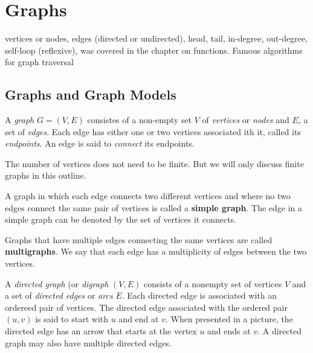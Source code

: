 



\chapter {Graphs}
vertices or nodes, edges (directed or undirected), head, tail, in-degree, out-degree, self-loop (reflexive), was covered in the chapter on functions.
Famous algorithms for graph traversal


\section {Graphs and Graph Models}
\begin{definition}[Graph]
A \textit{graph} $G =(V,E)$ consistes of a non-empty set $V$ of \textit{vertices} or \textit{nodes} and $E$, a set of \textit{edges}. Each edge has either one or two vertices associated ith it, called its \textit{endpoints}. An edge is said to \textit{connect} its endpoints.
\end{definition}
\begin{notes}
The number of vertices does not need to be finite. But we will only discuss finite graphs in this outline.
\end{notes}

\begin {definition} 
A graph in which each edge connects two different vertices and where no two edges connect the same pair of vertices is called a \textbf{simple graph}. The edge in a simple graph can be denoted by the set of vertices it connects.
\end{definition}

\begin {definition}[Multigraph]
Graphs that have multiple edges connecting the same vertices are called \textbf{multigraphs}. We say that each edge has a multiplicity of edges between the two vertices.
\end{definition}

\begin{definition}
A \textit{directed graph} (or \textit{digraph} $(V,E)$ consists of a nonempty set of vertices $V$ and a set of \textit{directed edges} or \textit{arcs} $E$. Each directed edge is associated with an ordereed pair of vertices. The directed edge associated with the ordered pair $(u,v)$ is said to start with $u$ and end at $v$. When presented in a picture, the directed edge has an arrow that starts at the vertex $u$ and ends at $v$. A directed graph may also have multiple directed edges.
\end{definition}

